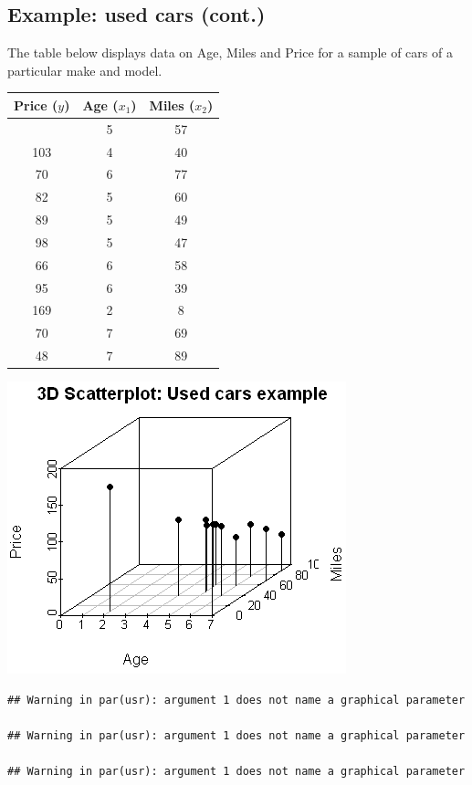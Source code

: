 \documentclass[
]{article}
\begin{document}
\hypertarget{example-used-cars-cont.-5}{%
\subsection{Example: used cars
(cont.)}\label{example-used-cars-cont.-5}}

The table below displays data on Age, Miles and Price for a sample of
cars of a particular make and model.

\begin{longtable}[]{@{}ccc@{}}
\toprule\noalign{}
Price (\(y\)) & Age (\(x_1\)) & Miles (\(x_2\)) \\
\midrule\noalign{}
\endhead
\bottomrule\noalign{}
\endlastfoot
85 & 5 & 57 \\
103 & 4 & 40 \\
70 & 6 & 77 \\
82 & 5 & 60 \\
89 & 5 & 49 \\
98 & 5 & 47 \\
66 & 6 & 58 \\
95 & 6 & 39 \\
169 & 2 & 8 \\
70 & 7 & 69 \\
48 & 7 & 89 \\
\end{longtable}

\begin{center}\includegraphics[width=0.4\linewidth,height=0.4\textheight]{figures/3d1} \end{center}

\begin{verbatim}
## Warning in par(usr): argument 1 does not name a graphical parameter

## Warning in par(usr): argument 1 does not name a graphical parameter

## Warning in par(usr): argument 1 does not name a graphical parameter
\end{verbatim}
\end{document}
